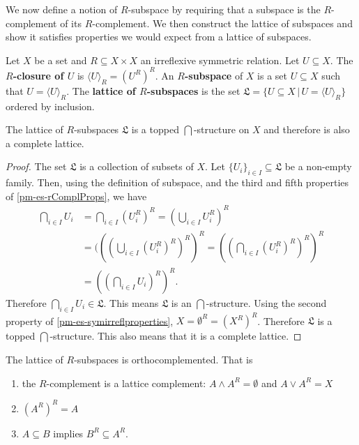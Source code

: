 We now define a notion of $R$-subspace by requiring that a subspace is the $R$-complement of its $R$-complement. We then construct the lattice of subspaces and show it satisfies properties we would expect from a lattice of subspaces.

\begin{mathSection}
	\begin{defn}
		Let $X$ be a set and $R \subseteq X \times X$ an irreflexive symmetric relation. Let $U \subseteq X$. The \textbf{$R$-closure of $U$} is $\langle U \rangle_R = (U^{R})^{R}$. An \textbf{$R$-subspace} of $X$ is a set $U \subseteq X$ such that $U = \langle U \rangle_R$. The \textbf{lattice of $R$-subspaces} is the set $\mathfrak{L} = \{ U \subseteq X \, | \, U = \langle U \rangle_R \}$ ordered by inclusion.
	\end{defn}
	
	\begin{coro}
		The lattice of $R$-subspaces $\mathfrak{L}$ is a topped $\bigcap$-structure on $X$ and therefore is also a complete lattice.
	\end{coro}
	\begin{proof}
		The set $\mathfrak{L}$ is a collection of subsets of $X$. Let $\{U_i\}_{i \in I} \subseteq \mathfrak{L}$ be a non-empty family. Then, using the definition of subspace, and the third and fifth properties of \ref{pm-es-rComplProps}, we have
		\begin{align*}
			\bigcap_{i \in I} U_i &= \bigcap_{i \in I} (U_i^{R})^{R} = (\bigcup_{i \in I} U_i^{R})^{R} \\
			&= (((\bigcup_{i \in I} (U_i^{R})^{R})^{R})^{R} = ((\bigcap_{i \in I} (U_i^{R})^{R})^{R})^{R} \\
			&= ((\bigcap_{i \in I} U_i)^{R})^{R}.
		\end{align*}
		Therefore $\bigcap_{i \in I} U_i \in \mathfrak{L}$. This means $\mathfrak{L}$ is an $\bigcap$-structure. Using the second property of \ref{pm-es-symirreflproperties}, $X = \emptyset^{R} = (X^{R})^{R}$. Therefore $\mathfrak{L}$ is a topped $\bigcap$-structure. This also means that it is a complete lattice.
	\end{proof}
	
	\begin{prop}
		The lattice of $R$-subspaces is orthocomplemented. That is
		\begin{enumerate}
			\item the $R$-complement is a lattice complement: $A \wedge A^{R} = \emptyset$ and $A \vee A^{R} = X$
			\item $(A^{R})^{R} = A$
			\item $A \subseteq B$ implies $B^{R} \subseteq A^{R}$.
		\end{enumerate}
	\end{prop}
	

\end{mathSection}
